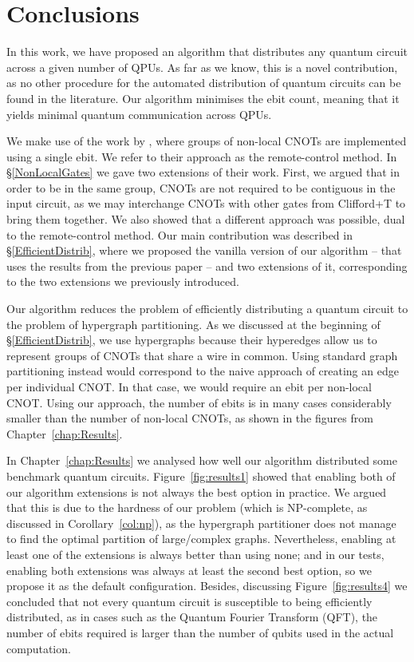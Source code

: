 \chapter{Conclusions}
\label{chap:Conclusions}

In this work, we have proposed an algorithm that distributes any quantum circuit across a given number of QPUs. As far as we know, this is a novel contribution, as no other procedure for the automated distribution of quantum circuits can be found in the literature. Our algorithm minimises the ebit count, meaning that it yields minimal quantum communication across QPUs.

We make use of the work by \citet{NonLocalCNOT}, where groups of non-local CNOTs are implemented using a single ebit. We refer to their approach as the remote-control method. In \S\ref{NonLocalGates} we gave two extensions of their work. First, we argued that in order to be in the same group, CNOTs are not required to be contiguous in the input circuit, as we may interchange CNOTs with other gates from Clifford+T to bring them together. We also showed that a different approach was possible, dual to the remote-control method. Our main contribution was described in \S\ref{EfficientDistrib}, where we proposed the vanilla version of our algorithm -- that uses the results from the previous paper -- and two extensions of it, corresponding to the two extensions we previously introduced. 

Our algorithm reduces the problem of efficiently distributing a quantum circuit to the problem of hypergraph partitioning. As we discussed at the beginning of \S\ref{EfficientDistrib}, we use hypergraphs because their hyperedges allow us to represent groups of CNOTs that share a wire in common. Using standard graph partitioning instead would correspond to the naive approach of creating an edge per individual CNOT. In that case, we would require an ebit per non-local CNOT. Using our approach, the number of ebits is in many cases considerably smaller than the number of non-local CNOTs, as shown in the figures from Chapter~\ref{chap:Results}.

In Chapter~\ref{chap:Results} we analysed how well our algorithm distributed some benchmark quantum circuits. Figure~\ref{fig:results1} showed that enabling both of our algorithm extensions is not always the best option in practice. We argued that this is due to the hardness of our problem (which is NP-complete, as discussed in Corollary~\ref{col:np}), as the hypergraph partitioner does not manage to find the optimal partition of large/complex graphs. Nevertheless, enabling at least one of the extensions is always better than using none; and in our tests, enabling both extensions was always at least the second best option, so we propose it as the default configuration. Besides, discussing Figure~\ref{fig:results4} we concluded that not every quantum circuit is susceptible to being efficiently distributed, as in cases such as the Quantum Fourier Transform (QFT), the number of ebits required is larger than the number of qubits used in the actual computation. 

